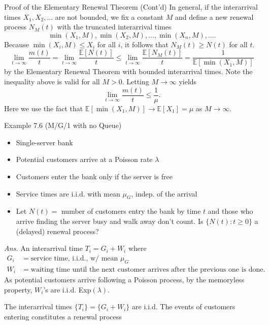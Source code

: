 \documentclass[letterpaper,handout, mathserif]{beamer}
\def\E{\mathbb E}
\begin{document}
\begin{frame}{Proof of the Elementary Renewal Theorem (Cont'd)}
In general, if the interarrival times $X_1, X_2, \ldots$ are not bounded,
we fix a constant $M$ and define a new renewal process $N_M(t)$ with the truncated interarrival times $$\min(X_1,M),\min(X_2,M),\ldots,\min(X_n,M),\ldots.$$
Because $\min(X_i,M) \le X_i$ for all $i$, it follows that $N_M(t)\ge N(t)$ for all $t$.
\[
\lim_{t\to\infty}\frac{m(t)}{t}=\lim_{t\to\infty}\frac{\E[N(t)]}{t}\le \lim_{t\to\infty}\frac{\E[N_M(t)]}{t}=\frac{1}{\E[\min(X_1,M)]}
\]
by the Elementary Renewal Theorem with bounded interarrival times.
Note the inequality above is valid for all $M>0.$
Letting $M\to\infty$ yields
$$\lim_{t\to\infty}\frac{m(t)}{t}\le \frac{1}{\mu}.$$
Here we use the fact that $\E[\min(X_1,M)]\to\E[X_1]=\mu$ as $M\to\infty.$
\end{frame}
\begin{frame}{Example 7.6 (M/G/1 with no Queue)}
\begin{itemize}
\item Single-server bank
\item Potential customers arrive at a Poisson rate $\lambda$
\item Customers enter the bank only if the server is free
\item Service times are i.i.d. with mean $\mu_G$, indep. of the arrival
\item Let $N(t)=$ number of customers entry the bank by time $t$ and
those who arrive finding the server busy and walk away don't count.
Is $\{N(t): t\ge 0\}$ a (delayed) renewal process?
\end{itemize}
{\it Ans.} An interarrival time $T_i=G_i+W_i$ where
\begin{align*}
G_i&=\text{service time, i.i.d., w/ mean }\mu_G\\
W_i&=\text{waiting time until the next customer arrives after the previous one is done}.
\end{align*}
As potential customers arrive following a Poisson process, by the memoryless property,
$W_i$'s are i.i.d. Exp$(\lambda)$.\smallskip


The interarrival times $\{T_i\}=\{G_i+W_i\}$ are i.i.d. The events of customers entering constitutes a renewal process
\end{frame}
\end{document}
